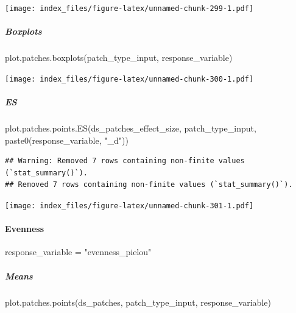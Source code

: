 \documentclass[
]{article}
\newenvironment{Shaded}{\begin{snugshade}}{\end{snugshade}}
\newcommand{\FunctionTok}[1]{\textcolor[rgb]{0.00,0.00,0.00}{#1}}
\newcommand{\NormalTok}[1]{#1}
\newcommand{\OtherTok}[1]{\textcolor[rgb]{0.56,0.35,0.01}{#1}}
\newcommand{\StringTok}[1]{\textcolor[rgb]{0.31,0.60,0.02}{#1}}
\begin{document}
\texttt{[image: index\_files/figure-latex/unnamed-chunk-299-1.pdf]}

\hypertarget{boxplots-17}{%
\subparagraph{Boxplots}\label{boxplots-17}}

\begin{Shaded}
\begin{Highlighting}[]
\FunctionTok{plot.patches.boxplots}\NormalTok{(patch\_type\_input,}
\NormalTok{                       response\_variable)}
\end{Highlighting}
\end{Shaded}

\texttt{[image: index\_files/figure-latex/unnamed-chunk-300-1.pdf]}

\hypertarget{es-2}{%
\subparagraph{ES}\label{es-2}}

\begin{Shaded}
\begin{Highlighting}[]
\FunctionTok{plot.patches.points.ES}\NormalTok{(ds\_patches\_effect\_size, patch\_type\_input,}
                       \FunctionTok{paste0}\NormalTok{(response\_variable, }\StringTok{"\_d"}\NormalTok{))}
\end{Highlighting}
\end{Shaded}

\begin{verbatim}
## Warning: Removed 7 rows containing non-finite values (`stat_summary()`).
## Removed 7 rows containing non-finite values (`stat_summary()`).
\end{verbatim}

\texttt{[image: index\_files/figure-latex/unnamed-chunk-301-1.pdf]}

\hypertarget{evenness-1}{%
\paragraph{Evenness}\label{evenness-1}}

\begin{Shaded}
\begin{Highlighting}[]
\NormalTok{response\_variable }\OtherTok{=} \StringTok{"evenness\_pielou"}
\end{Highlighting}
\end{Shaded}

\hypertarget{means-19}{%
\subparagraph{Means}\label{means-19}}

\begin{Shaded}
\begin{Highlighting}[]
\FunctionTok{plot.patches.points}\NormalTok{(ds\_patches, patch\_type\_input,}
\NormalTok{                       response\_variable)}
\end{Highlighting}
\end{Shaded}
\end{document}
